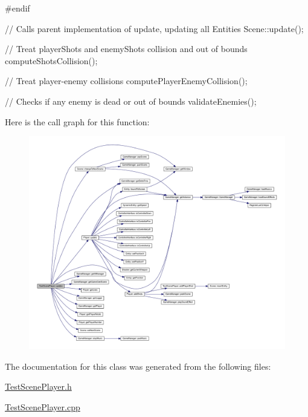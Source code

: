 \begin{DoxyCode}
{#endif

        // Calls parent implementation of update, updating all Entities
        Scene::update();

        // Treat playerShots and enemyShots collision and out of bounds
        computeShotsCollision();

        // Treat player-enemy collisions
        computePlayerEnemyCollision();

        // Checks if any enemy is dead or out of bounds
        validateEnemies();
}
\end{DoxyCode}


Here is the call graph for this function:
\nopagebreak
\begin{figure}[H]
\begin{center}
\leavevmode
\includegraphics[width=400pt]{d1/d1a/class_test_scene_player_a8285c9f16119d8423a0ed4858327097c_cgraph}
\end{center}
\end{figure}




The documentation for this class was generated from the following files:\begin{DoxyCompactItemize}
\item 
\hyperlink{_test_scene_player_8h}{TestScenePlayer.h}\item 
\hyperlink{_test_scene_player_8cpp}{TestScenePlayer.cpp}\end{DoxyCompactItemize}
